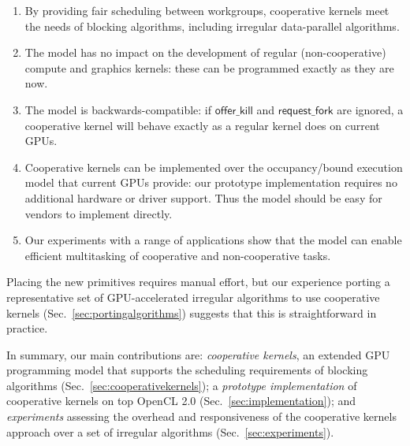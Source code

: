 \documentclass[parskip=half,sigconf,review, anonymous=true, acmcopyrightmode=none]{acmart}
\newcommand{\cutthree}[1]{}
\newcommand{\mysec}{Sec.~}
\newcommand{\offerfork}{\mathsf{request\_fork}}
\newcommand{\offerkill}{\mathsf{offer\_kill}}
\begin{document}
\begin{enumerate}[leftmargin=*]

\item By providing fair scheduling between workgroups, cooperative
  kernels meet the needs of blocking algorithms, including irregular
  data-parallel algorithms.

\item The model has no impact on the development of regular
  (non-cooperative) compute and graphics kernels: these can be programmed exactly as they
  are now.

\item The model is backwards-compatible: if $\offerkill$ and $\offerfork$ are ignored, a cooperative kernel will behave
  exactly as a regular kernel does on current GPUs.

\item Cooperative kernels can be implemented over the occupancy\-/bound
  execution model that current GPUs provide: our prototype implementation requires
  no additional hardware or driver support.  Thus the model should be easy for vendors to implement directly.

\item Our experiments with a range of applications \cutthree{using three GPUs} show that the model can enable efficient multitasking of cooperative and non-cooperative
  tasks.

\end{enumerate}

Placing the new primitives requires manual effort, but our experience porting a representative set of
GPU-accelerated irregular algorithms to use cooperative kernels
(\mysec\ref{sec:portingalgorithms}) suggests that this is straightforward in practice.

In summary, our main contributions are:
\emph{cooperative kernels}, an extended GPU programming model that supports the scheduling requirements of blocking algorithms (\mysec\ref{sec:cooperativekernels}); a \emph{prototype implementation} of cooperative
  kernels on top OpenCL 2.0
  (\mysec\ref{sec:implementation}); and \emph{experiments} assessing the overhead and responsiveness of the cooperative kernels approach over a set of irregular algorithms \cutthree{across three GPUs} (\mysec\ref{sec:experiments}).
\end{document}
